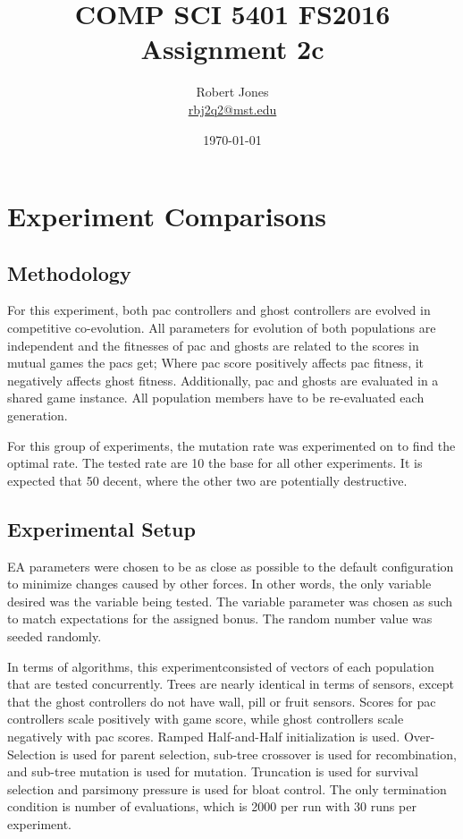 \documentclass{article}
\title{COMP SCI 5401 FS2016 Assignment 2c}
\author{Robert Jones \\ \href{mailto:rbj2q2@mst.edu}{rbj2q2@mst.edu} }
\date{\today}
\newcommand\tab[1][1cm]{\hspace*{#1}}
\begin{document}
\maketitle

\tableofcontents

\clearpage
\section{Experiment Comparisons}
\subsection{Methodology}
\begin{flushleft}
For this experiment, both pac controllers and ghost controllers are evolved in
 competitive co-evolution. All parameters for evolution of both populations are
 independent and the fitnesses of pac and ghosts are related to the scores in
 mutual games the pacs get; Where pac score positively affects pac fitness,
 it negatively affects ghost fitness. Additionally, pac and ghosts are evaluated
 in a shared game instance. All population members have to be re-evaluated each
 generation.

 \tab
For this group of experiments, the mutation rate was experimented on to find
 the optimal rate. The tested rate are 10%
 the base for all other experiments. It is expected that 50%
 decent, where the other two are potentially destructive.
\end{flushleft}
\subsection{Experimental Setup}
\begin{flushleft}
EA parameters were chosen to be as close as possible to the default
 configuration to minimize changes caused by other forces. In other words, the
 only variable desired was the variable being tested. The variable parameter was
 chosen as such to match expectations for the assigned bonus. The random number
 value was seeded randomly.

\tab
In terms of algorithms, this experimentconsisted of vectors of each population
 that are tested concurrently. Trees are nearly identical in terms of sensors,
 except that the ghost controllers do not have wall, pill or fruit sensors.
 Scores for pac controllers scale positively with game score, while ghost
 controllers scale negatively with pac scores. Ramped Half-and-Half
 initialization is used. Over-Selection is used for parent selection, sub-tree
 crossover is used for recombination, and sub-tree mutation is used for
 mutation. Truncation is used for survival selection and parsimony pressure is
 used for bloat control. The only termination condition is number of
 evaluations, which is 2000 per run with 30 runs per experiment.
\end{flushleft}
\end{document}
